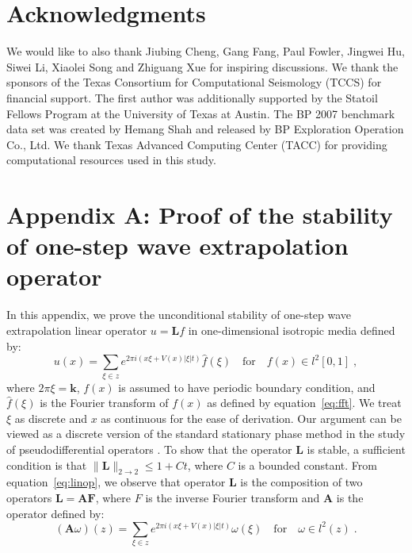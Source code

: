 \section{Acknowledgments}

We would like to also thank Jiubing Cheng, Gang Fang, Paul Fowler, Jingwei Hu, Siwei Li, Xiaolei Song and Zhiguang Xue for inspiring discussions. We thank the sponsors of the Texas Consortium for Computational Seismology (TCCS) for financial support. The first author was additionally supported by the Statoil Fellows Program at the University of Texas at Austin. The BP 2007 benchmark data set was created by Hemang Shah and released by BP Exploration Operation Co., Ltd. We thank Texas Advanced Computing Center (TACC) for providing computational resources used in this study.

\section{Appendix A: Proof of the stability of one-step wave extrapolation operator}
\label{sec:stability}

\newcommand{\x}{\mathbf{x}}
\renewcommand{\k}{\mathbf{k}}
\renewcommand{\L}{\mathbf{L}}
\newcommand{\A}{\mathbf{A}}
\newcommand{\F}{\mathbf{F}}
\newcommand{\G}{\mathbf{G}}
\newcommand{\fk}{\hat{f}}
\newcommand{\xii}{\mathbf{\xi}}

In this appendix, we prove the unconditional stability of one-step wave
extrapolation linear operator $u = \L f$ in one-dimensional isotropic
media defined by:
\begin{equation}
\label{eq:linop}
  u(x) = \sum\limits_{\xi \in z} e^{ 2\pi i(x \xi+V(x)|\xi|t)} \fk(\xi) \quad \mbox{for} \quad f(x) \in l^2[0,1] \; ,
\end{equation}
where $2\pi\xi = \k$, $f(x)$ is assumed to have periodic boundary
condition, and $\fk(\xi)$ is the Fourier transform of $f(x)$ as
defined by equation~\ref{eq:fft}. We treat $\xi$ as discrete and $x$
as continuous for the ease of derivation. Our argument can be viewed
as a discrete version of the standard stationary phase method in the
study of pseudodifferential operators \cite{Grigis,Stein}. To show
that the operator $\L$ is stable, a sufficient condition is that
$ \|\L\|_{2 \to 2} \leq 1+Ct$, where $C$ is a bounded constant.  From
equation~\ref{eq:linop}, we observe that operator $\L$ is the
composition of two operators $\L = \A \F$, where $F$ is the inverse
Fourier transform and $\A$ is the operator defined by:
\begin{equation}
(\A \omega)(z) = \sum\limits_{\xi\in z}e^{ 2\pi i(x \xi+V(x)|\xi|t)}\omega(\xi) \quad \mbox{for} \quad \omega \in l^2(z) \; .
\end{equation}

